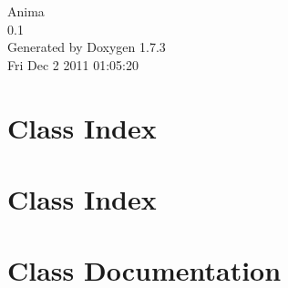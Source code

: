 \documentclass[a4paper]{book}
\begin{document}
\hypersetup{pageanchor=false}
\begin{titlepage}
\vspace*{7cm}
\begin{center}
{\Large Anima \\[1ex]\large 0.1 }\\
\vspace*{1cm}
{\large Generated by Doxygen 1.7.3}\\
\vspace*{0.5cm}
{\small Fri Dec 2 2011 01:05:20}\\
\end{center}
\end{titlepage}
\clearemptydoublepage
{}
\tableofcontents
\clearemptydoublepage
{}
\hypersetup{pageanchor=true}
\chapter{Class Index}

\chapter{Class Index}

\chapter{Class Documentation}





























\printindex
\end{document}
